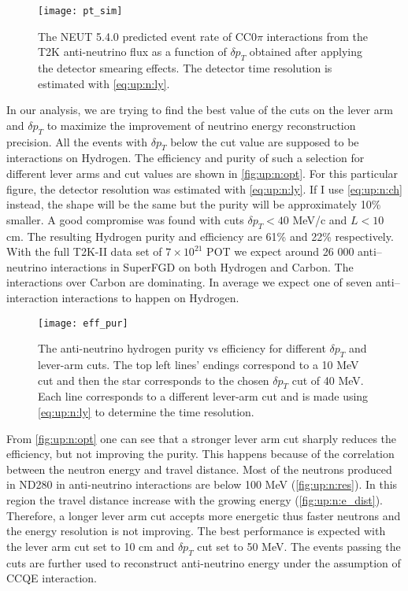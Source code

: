 \documentclass[main.tex]{subfiles}
\begin{document}
\begin{figure}[!ht]
  \centering
  \texttt{[image: pt\_sim]}
  \caption{The NEUT 5.4.0 predicted event rate of CC0$\pi$ interactions from the T2K anti-neutrino flux as a function of $\delta p_T$ obtained after applying the detector smearing effects. The detector time resolution is estimated with \autoref{eq:up:n:ly}.}
  \label{fig:up:n:dpt_sim}
\end{figure}

In our analysis, we are trying to find the best value of the cuts on the lever arm and $\delta p_T$ to maximize the improvement of neutrino energy reconstruction precision. All the events with $\delta p_T$ below the cut value are supposed to be interactions on Hydrogen. The efficiency and purity of such a selection for different lever arms and cut values are shown in \autoref{fig:up:n:opt}. For this particular figure, the detector resolution was estimated with \autoref{eq:up:n:ly}. If I use \autoref{eq:up:n:ch} instead, the shape will be the same but the purity will be approximately 10\% smaller. A good compromise was found with cuts $\delta p_T < 40$ MeV/c and $L < 10$ cm. The resulting Hydrogen purity and efficiency are 61\% and 22\% respectively. With the full T2K-II data set of $7\times 10^{21}$ POT we expect around 26 000 anti--neutrino interactions in SuperFGD on both Hydrogen and Carbon. The interactions over Carbon are dominating. In average we expect one of seven anti--interaction interactions to happen on Hydrogen.

\begin{figure}[!ht]
  \centering
  \texttt{[image: eff\_pur]}
  \caption{The anti-neutrino hydrogen purity vs efficiency for different $\delta p_T$ and lever-arm cuts. The top left lines' endings correspond to a 10 MeV cut and then the star corresponds to the chosen $\delta p_T$ cut of 40 MeV. Each line corresponds to a different lever-arm cut and is made using \autoref{eq:up:n:ly} to determine the time resolution.}
  \label{fig:up:n:opt}
\end{figure}

From \autoref{fig:up:n:opt} one can see that a stronger lever arm cut sharply reduces the efficiency, but not improving the purity. This happens because of the correlation between the neutron energy and travel distance. Most of the neutrons produced in ND280 in anti-neutrino interactions are below 100 MeV (\autoref{fig:up:n:res}). In this region the travel distance increase with the growing energy (\autoref{fig:up:n:e_dist}). Therefore, a longer lever arm cut accepts more energetic thus faster neutrons and the energy resolution is not improving. The best performance is expected with the lever arm cut set to 10 cm and $\delta p_T$ cut set to 50 MeV. The events passing the cuts are further used to reconstruct anti-neutrino energy under the assumption of CCQE interaction.
\end{document}
